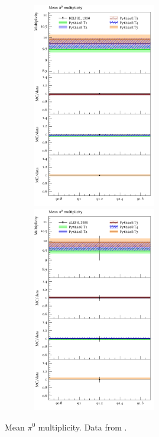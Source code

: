 \documentclass[aps,preprint,floatfix,nofootinbib,showpacs]{revtex4-1}
\begin{document}
  \begin{figure}[btp]
 \centering
 \includegraphics[width=8cm, height=9cm]{DELPHI_1996/d36-x01-y02.pdf}
 \hfill
  \includegraphics[width=8cm, height=9cm]{ALEPH_1996/d44-x01-y02.pdf}
  \caption{Mean $\pi^0$ multiplicity. Data from \cite{Barate:1996fi, Abreu:1996na}.}
  \label{Fig-6}
 \end{figure}
 
\end{document}
